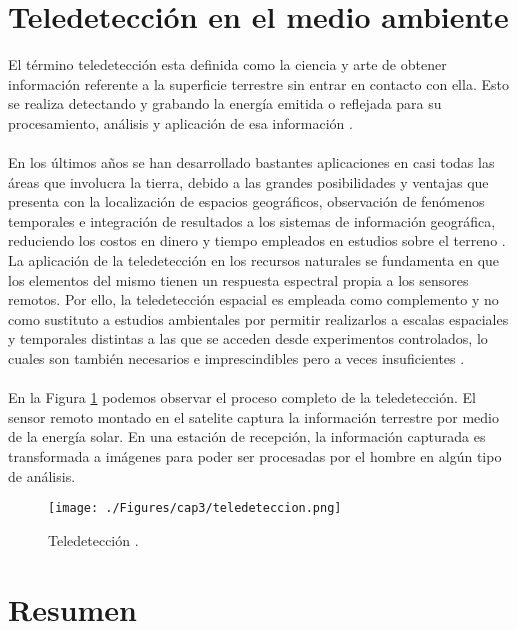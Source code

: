 \section{Teledetecci\'on en el medio ambiente}
El t\'ermino teledetecci\'on esta definida como la ciencia y arte de obtener informaci\'on referente a la superficie terrestre sin entrar en contacto con ella. Esto se realiza detectando y grabando la energ\'ia emitida o reflejada para su procesamiento, an\'alisis y aplicaci\'on de esa informaci\'on \cite{salinero2002teledeteccion}.\\~\\
En los \'ultimos a\~{n}os se han desarrollado bastantes aplicaciones en casi todas las \'areas que involucra la tierra, debido a las grandes posibilidades y ventajas que presenta con la localizaci\'on de espacios geogr\'aficos, observaci\'on de fen\'omenos temporales e integraci\'on de resultados a los sistemas de informaci\'on geogr\'afica, reduciendo los costos en dinero y tiempo empleados en estudios sobre el terreno \cite{baker2006mapping}. La aplicaci\'on de la teledetecci\'on en los recursos naturales se fundamenta en que los elementos del mismo tienen un respuesta espectral propia a los sensores remotos. Por ello, la teledetecci\'on espacial es empleada como complemento y no como sustituto a estudios ambientales por permitir realizarlos a escalas espaciales y temporales distintas a las que se acceden desde experimentos controlados, lo cuales son tambi\'en necesarios e imprescindibles pero a veces insuficientes \cite{perez2011aplicaciones}.\\~\\
En la Figura \ref{fig:tele} podemos observar el proceso completo de la teledetecci\'on. El sensor remoto montado en el satelite captura la informaci\'on terrestre por medio de la energ\'ia solar. En una estaci\'on de recepci\'on, la informaci\'on capturada es transformada a im\'agenes para poder ser procesadas por el hombre en alg\'un tipo de an\'alisis. 

	\begin{figure}[H]
		\centering
		\texttt{[image: ./Figures/cap3/teledeteccion.png]}
		\caption{Teledetecci\'on \cite{teledet2015perce}.}
		\label{fig:tele}
	\end{figure}

\section{Resumen}

